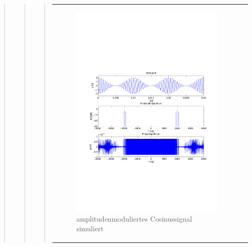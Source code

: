 \begin{quote}
\begin{quote}
\begin{quote}
\begin{center}
\begin{tabular}{ll}
                \hspace{-10em}
                    \begin{minipage}{0.6\textwidth}
    
                        \begin{figure}[H]
                            \label{fig:}
                            \includegraphics[scale=0.4, trim = 2cm 6.5cm 1.5cm
                            8.5cm, clip]{./Bilder/Cosinusmodsimuliert} %
                            \caption{amplitudenmoduliertes Cosinussignal simuliert}
                        \end{figure}
    
                    \end{minipage}
                    \begin{minipage}{0.6\textwidth}
    

\end{minipage}
\end{tabular}
\end{center}
\end{quote}
\end{quote}
\end{quote}
